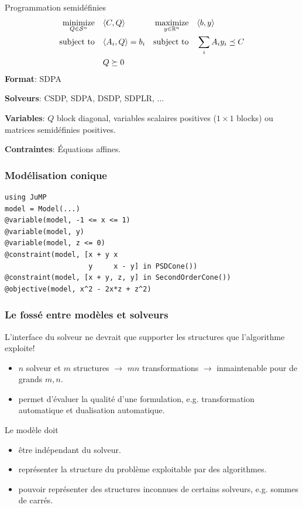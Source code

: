 \documentclass{beamer}
\begin{document}
  \begin{frame}{Programmation semidéfinies}
    \begin{align*}
      \operatorname*{minimize}_{Q \in \mathcal{S}^n} \quad & \langle C, Q \rangle & \operatorname*{maximize}_{y \in \mathbb{R}^n} \quad & \langle b, y \rangle\\
      \operatorname*{\operatorname*{\text{subject to}}\quad} & \langle A_i, Q \rangle = b_i & \operatorname*{\operatorname*{\text{subject to}}\quad} & \sum_i A_i y_i \preceq C\\
        & Q \succeq 0
    \end{align*}
    \textbf{Format}: SDPA

    \textbf{Solveurs}: CSDP, SDPA, DSDP, SDPLR, ...

    \textbf{Variables}: $Q$ block diagonal, variables scalaires positives ($1 \times 1$ blocks) ou matrices semidéfinies positives.

    \textbf{Contraintes}: Équations affines.
  \end{frame}

  \begin{frame}[fragile]
    \frametitle{Modélisation conique}
\begin{verbatim}
using JuMP
model = Model(...)
@variable(model, -1 <= x <= 1)
@variable(model, y)
@variable(model, z <= 0)
@constraint(model, [x + y x
                    y     x - y] in PSDCone())
@constraint(model, [x + y, z, y] in SecondOrderCone())
@objective(model, x^2 - 2x*z + z^2)
\end{verbatim}
  \end{frame}

  \begin{frame}
    \frametitle{Le fossé entre modèles et solveurs}
    L'interface du solveur ne devrait que supporter les structures que l'algorithme \alert{exploite}!
    \begin{itemize}
      \item
        $n$ solveur et $m$ structures $\to$ $mn$ transformations $\to$ inmaintenable pour de grands $m, n$.
      \item
        permet d'évaluer la qualité d'une formulation, e.g. transformation automatique et
        dualisation automatique.
    \end{itemize}

    Le modèle doit
    \begin{itemize}
      \item être \alert{indépendant} du solveur.
      \item représenter la structure du problème \alert{exploitable} par des algorithmes.
      \item pouvoir représenter des structures \alert{inconnues} de certains solveurs, e.g. sommes de carrés.
    \end{itemize}
  \end{frame}
\end{document}
